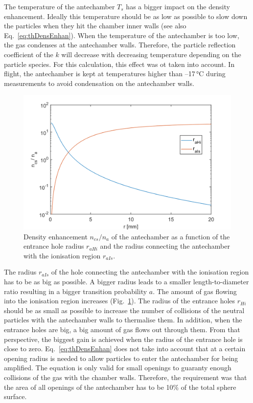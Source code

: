 	The temperature of the antechamber $T_s$ has a bigger impact on the density enhancement. Ideally this temperature should be as low as possible to slow down the particles when they hit the chamber inner walls (see also Eq.~\eqref{eq:thDensEnhan}). When the temperature of the antechamber is too low, the gas condenses at the antechamber walls. Therefore, the particle reflection coefficient of the $k$ will decrease with decreasing temperature depending on the particle species. For this calculation, this effect was ot taken into account. In flight, the antechamber is kept at temperatures higher than --17\,\si{\degreeCelsius} during measurements to avoid condensation on the antechamber walls.\\
	\begin{figure}[H] %
		\centering
		\includegraphics[width= .7\textwidth]{Bilder/raHi_raIs.png}
		\caption{Density enhancement $n_{cs}/n_a$ of the antechamber as a function of the entrance hole radius $r_{aHi}$ and the radius connecting the antechamber with the ionisation region $r_{aIs}$.}
		\label{th:densEnhraHiraIs}
	\end{figure}
	The radius $r_{aIs}$ of the hole connecting the antechamber with the ionisation region has to be as big as possible. A bigger radius leads to a smaller length-to-diameter ratio resulting in a bigger transition probability $a$. The amount of gas flowing into the ionisation region increases (Fig.~\ref{th:densEnhraHiraIs}). The radius of the entrance holes $r_{Hi}$ should be as small as possible to increase the number of collisions of the neutral particles with the antechamber walls to thermalise them. In addition, when the entrance holes are big, a big amount of gas flows out through them. From that perspective, the biggest gain is achieved when the radius of the entrance hole is close to zero. Eq.~\eqref{eq:thDensEnhan} does not take into account that at a certain opening radius is needed to allow particles to enter the antechamber for being amplified. The equation is only valid for small openings to guaranty enough collisions of the gas with the chamber walls. Therefore, the requirement was that the area of all openings of the antechamber has to be 10\% of the total sphere surface.\\
